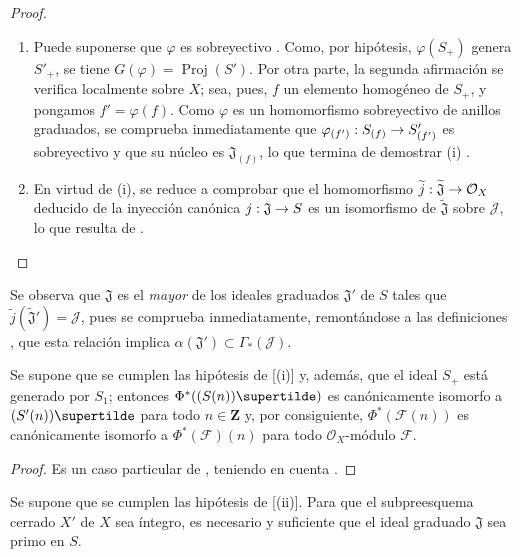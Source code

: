 \documentclass[oneside,10pt]{amsart}
\makeatletter
\newcommand{\ega@arrow}[2]{\mathchoice{#1}{#2}{#2}{#2}}
\renewcommand{\to}{\ega@arrow{\longrightarrow}{\rightarrow}}
\let\EGAOriginalLabel\label
\renewcommand{\label}[1]{\phantomsection\EGAOriginalLabel{#1}}
\makeatother
\begin{document}
\begin{proof}
\medskip\noindent
\begin{enumerate}
  \item[{\rm(i)}] Puede suponerse que $\varphi$ es sobreyectivo .
    Como, por hipótesis, $\varphi(S_+)$ genera $S'_+$, se tiene $G(\varphi)=\operatorname{Proj}(S')$.
    Por otra parte, la segunda afirmación se verifica localmente sobre $X$; sea, pues, $f$ un elemento homogéneo de $S_+$, y pongamos $f'=\varphi(f)$.
    Como $\varphi$ es un homomorfismo sobreyectivo de anillos graduados, se comprueba inmediatamente que $\varphi_{(f')}:S_{(f)}\to S'_{(f')}$ es sobreyectivo y que su núcleo es $\mathfrak{J}_{(f)}$, lo que termina de demostrar (i) .
  \item[{\rm(ii)}] En virtud de (i), se reduce a comprobar que el homomorfismo $\widetilde{j}:\widetilde{\mathfrak{J}}\to\mathcal{O}_X$ deducido de la inyección canónica $j:\mathfrak{J}\to S$ es un isomorfismo de $\widetilde{\mathfrak{J}}$ sobre $\mathcal{J}$, lo que resulta de .
\end{enumerate}
\end{proof}

Se observa que $\mathfrak{J}$ es el \emph{mayor} de los ideales graduados $\mathfrak{J}'$ de $S$ tales que $\widetilde{j}(\widetilde{\mathfrak{J}}')=\mathcal{J}$, pues se comprueba inmediatamente, remontándose a las definiciones , que esta relación implica $\alpha(\mathfrak{J}')\subset\Gamma_*(\mathcal{J})$.

\begin{corollary}[2.9.3]
\label{II.2.9.3-fr}
Se supone que se cumplen las hipótesis de [(i)] y, además, que el ideal $S_+$ está generado por $S_1$; entonces $\Phi^*((S(n))\supertilde)$ es canónicamente isomorfo a $(S'(n))\supertilde$ para todo $n\in\mathbf{Z}$ y, por consiguiente, $\Phi^*(\mathcal{F}(n))$ es canónicamente isomorfo a $\Phi^*(\mathcal{F})(n)$ para todo $\mathcal{O}_X$-módulo $\mathcal{F}$.
\end{corollary}

\begin{proof}
Es un caso particular de , teniendo en cuenta .
\end{proof}

\begin{corollary}[2.9.4]
\label{II.2.9.4-fr}
Se supone que se cumplen las hipótesis de [(ii)].
Para que el subpreesquema cerrado $X'$ de $X$ sea íntegro, es necesario y suficiente que el ideal graduado $\mathfrak{J}$ sea primo en $S$.
\end{corollary}
\end{document}
